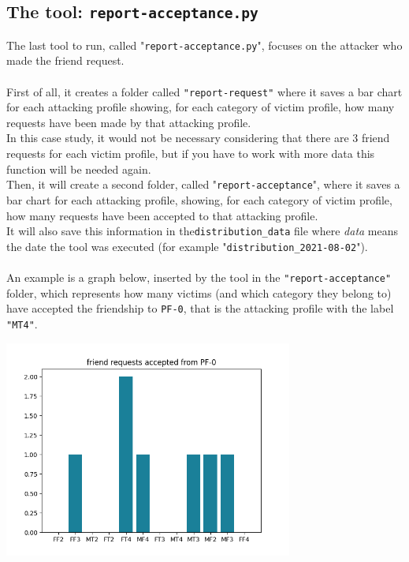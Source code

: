 \subsection{The tool: \texttt{report-acceptance.py}}
The last tool to run, called "\texttt{report-acceptance.py}", focuses on the attacker who made the friend request.\\\\
First of all, it creates a folder called \texttt{"report-request"} where it saves a bar chart for each attacking profile showing, for each category of victim profile, how many requests have been made by that attacking profile. \\In this case study, it would not be necessary considering that there are 3 friend requests for each victim profile, but if you have to work with more data this function will be needed again.
\\Then, it will create a second folder, called "\texttt{report-acceptance}", where it saves a bar chart for each attacking profile, showing, for each category of victim profile, how many requests have been accepted to that attacking profile.
\\It will also save this information in the\texttt{distribution\_data} file where \emph{data} means the date the tool was executed (for example "\texttt{distribution\_2021-08-02}").
\\\\An example is a graph below, inserted by the tool in the \texttt{"report-acceptance"} folder, which represents how many victims (and which category they belong to) have accepted the friendship to \texttt{PF-0}, that is the attacking profile with the label \texttt{"MT4"}.\\
\begin{center}
	\includegraphics[width=9.5cm]{immagini/PF-0_report-acceptance.png} 
\end{center}